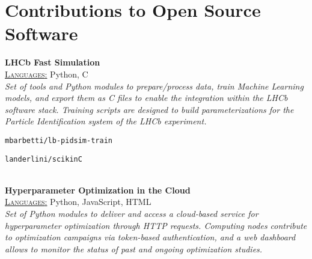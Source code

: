 \newcommand{\software}[1]
  {\normalsize \color{hlcolor-0} \textbf{#1}}

\newcommand{\pkginfo}[1]
  {\small \color{hlcolor-1} {\ul{\textsc{Languages}:} #1}}
  
\newcommand{\pkgdesc}[1]
  {\normalsize \color{maincolor} \emph{#1}}


\section*{Contributions to Open Source Software}
\begin{cvcontent}
  \software{LHCb Fast Simulation}
  \\ [0.5mm]
  \pkginfo{Python, C}
  \\ [1.5mm]
  \pkgdesc{Set of tools and Python modules to prepare/process data, 
  train Machine Learning models, and export them as C files to enable 
  the integration within the LHCb software stack. Training scripts
  are designed to build parameterizations for the Particle 
  Identification system of the LHCb experiment.}
  \\ [1.5mm]
  \begin{itemize*}[label=\textcolor{iconcolor}{\textbullet}]
    \item \texttt{mbarbetti/lb-pidsim-train} \hfill
      \href{https://pypi.org/project/lb-pidsim-train}{\faPython}
      \href{https://github.com/mbarbetti/lb-pidsim-train}{\faGithub}
    \\ [0.5mm]
    \item \texttt{landerlini/scikinC} \hfill
      \href{https://pypi.org/project/scikinC}{\faPython}
      \href{https://github.com/landerlini/scikinC}{\faGithub}
  \end{itemize*}
  \\ [4mm]
  \software{Hyperparameter Optimization in the Cloud}
  \\ [0.5mm]
  \pkginfo{Python, JavaScript, HTML}
  \\ [1.5mm]
  \pkgdesc{Set of Python modules to deliver and access a cloud-based
  service for hyperparameter optimization through HTTP requests. 
  Computing nodes contribute to optimization campaigns via token-based
  authentication, and a web dashboard allows to monitor the status of
  past and ongoing optimization studies.}
  \\ [1.5mm]
  \begin{itemize*}[label=\textcolor{iconcolor}{\textbullet}]

\end{itemize*}
\end{cvcontent}
